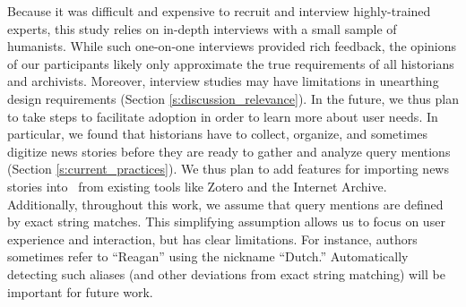 Because it was difficult and expensive to recruit and interview highly-trained experts, this study relies on in-depth interviews with a small sample of humanists.
While such one-on-one interviews provided rich feedback, the opinions of our participants likely only approximate the true requirements of all historians and archivists. Moreover, interview studies may have limitations in unearthing design requirements (Section \ref{s:discussion_relevance}).
In the future, we thus plan to take steps to facilitate adoption in order to learn more about user needs.
In particular, we found that historians have to collect, organize, and sometimes digitize news stories before they are ready to gather and analyze query mentions (Section \ref{s:current_practices}). 
We thus plan to add features for importing news stories into \ours~from existing tools like Zotero and the Internet Archive. 
Additionally, throughout this work, we assume that query mentions are defined by exact string matches.
This simplifying assumption allows us to focus on user experience and interaction, but has clear limitations.
For instance, authors sometimes refer to ``Reagan'' using the nickname ``Dutch.''
Automatically detecting such aliases (and other deviations from exact string matching) will be important for future work.